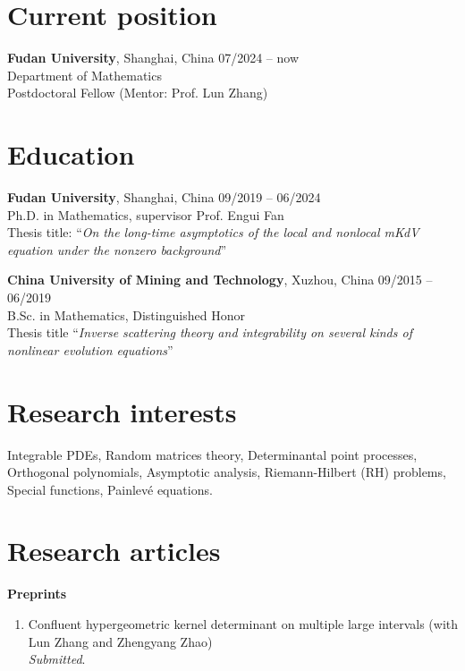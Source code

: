 \documentclass[margin]{res}
\begin{document}
\begin{resume}
\section{Current position}
\textbf{Fudan University}, Shanghai, China \hfill 07/2024 -- now\\
Department of Mathematics \\
Postdoctoral Fellow (Mentor: Prof. Lun Zhang)


\section{Education}
\textbf{Fudan University}, Shanghai, China \hfill 09/2019 -- 06/2024\\
Ph.D. in Mathematics, supervisor Prof. Engui Fan \\
Thesis title: ``{\sl On the long-time asymptotics of the local and nonlocal mKdV equation under the nonzero background}''
\par

\textbf{China University of Mining and Technology}, Xuzhou, China \hfill 09/2015 -- 06/2019\\ 
B.Sc. in Mathematics, Distinguished Honor \\
Thesis title ``{\sl Inverse scattering theory and integrability on several kinds of nonlinear evolution equations}''


\section{Research interests}
Integrable PDEs, Random matrices theory, Determinantal point processes, 
Orthogonal polynomials, Asymptotic analysis, Riemann-Hilbert (RH) problems, Special functions, 
Painlev\'e equations.

\section{Research articles}
\textbf{Preprints}
\begin{enumerate}[1.]
    \item Confluent hypergeometric kernel determinant on multiple large intervals (with Lun Zhang and Zhengyang Zhao)\\
    {\sl Submitted}.
\end{enumerate}


\end{resume}
\end{document}

